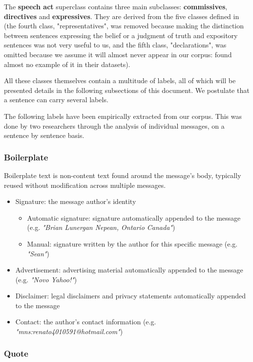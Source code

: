 \documentclass[11pt]{article}
\begin{document}
The \textbf{speech act} superclass contains three main subclasses: \textbf{commissives}, \textbf{directives} and \textbf{expressives}. They are derived from the five classes defined in \cite{searle1976taxonomy} (the fourth class, "representatives", was removed because making the distinction between sentences expressing the belief or a judgment of truth and expository sentences was not very useful to us, and the fifth class, "declarations", was omitted because we assume it will almost never appear in our corpus: \cite{qadir2011classifying} found almost no example of it in their datasets).

All these classes themselves contain a multitude of labels, all of which will be presented details in the following subsections of this document. We postulate that a sentence can carry several labels.

The following labels have been empirically extracted from our corpus. This was done by two researchers through the analysis of individual messages, on a sentence by sentence basis.

\subsubsection{Boilerplate}

Boilerplate text is non-content text found around the message's body, typically reused without modification across multiple messages.

\begin{itemize}
	\item Signature: the message author's identity
		\begin{itemize}
			\item Automatic signature: signature automatically appended to the message (e.g. \textit{"Brian Lunergan Nepean, Ontario Canada"})
			\item Manual: signature written by the author for this specific message (e.g. \textit{"Sean"})
		\end{itemize}
	\item Advertisement: advertising material automatically appended to the message (e.g. \textit{"Novo Yahoo!"})
	\item Disclaimer: legal disclaimers and privacy statements automatically appended to the message
	\item Contact: the author's contact information (e.g. \textit{"mns:renato4010591@hotmail.com"})
\end{itemize}

\subsubsection{Quote}
\end{document}
